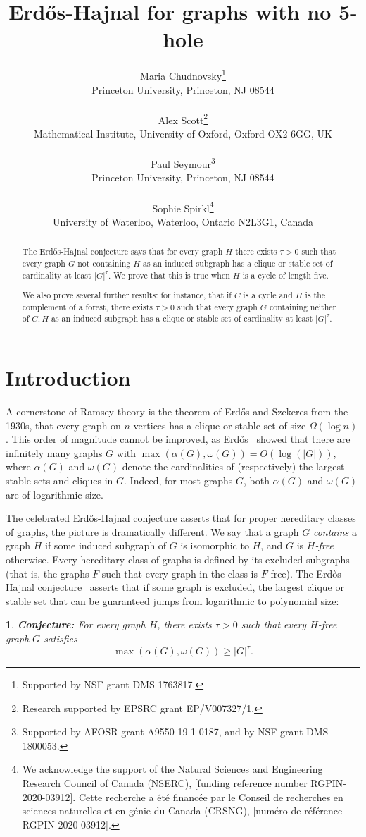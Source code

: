 \documentclass[titlepage,11pt]{article}
\title{Erd\H{o}s-Hajnal for graphs with no 5-hole}
\author{Maria Chudnovsky\thanks{Supported by  NSF grant DMS 1763817.}\\
Princeton University, Princeton, NJ 08544
\\
\\
Alex Scott\thanks{Research supported by EPSRC grant EP/V007327/1.}\\
Mathematical Institute, University of Oxford, Oxford OX2 6GG, UK
\\
\\
Paul Seymour\thanks{Supported by AFOSR grant
A9550-19-1-0187, and by NSF grant  DMS-1800053.}\\
Princeton University, Princeton, NJ 08544
\\
\\
Sophie Spirkl\thanks{We acknowledge the support of the Natural Sciences and Engineering Research
Council of Canada (NSERC), [funding reference number RGPIN-2020-03912].
Cette recherche a \'et\'e financ\'ee par le Conseil de recherches en sciences
naturelles et en g\'enie du Canada (CRSNG), [num\'ero de r\'ef\'erence
RGPIN-2020-03912].  }\\
University of Waterloo, Waterloo, Ontario N2L3G1, Canada}
\date{}
\newtheorem{thm}{}[section]
\begin{document}
\maketitle
\begin{abstract} 
The Erd\H{o}s-Hajnal conjecture says that for every graph $H$ there exists $\tau>0$
such that 
every graph $G$ not containing $H$ as an induced subgraph has a clique or stable set of cardinality at least $|G|^\tau$.
We prove that this is true when $H$ is a cycle of length five. 

We also prove several further results: for instance, that 
if $C$ is a cycle and $H$ is the complement of a forest, 
there exists $\tau>0$ such that every graph $G$ containing neither of $C,H$ as an induced subgraph
has a clique or stable set of cardinality at least $|G|^\tau$.



\end{abstract}

\section{Introduction}



A cornerstone of Ramsey theory is the theorem of Erd\H os and Szekeres \cite{ESz} from the 1930s, that every graph on $n$ vertices
has a clique or stable set of size $\Omega(\log n)$. This order of magnitude cannot be improved, as Erd\H os~\cite{E} showed 
that there are infinitely many graphs $G$ with $\max(\alpha(G),\omega(G))=O(\log(|G|))$, where $\alpha(G)$ and $\omega(G)$ denote 
the cardinalities of (respectively) the largest stable sets and 
cliques in $G$.  Indeed, for most graphs $G$, both $\alpha(G)$ and $\omega(G)$ are of logarithmic size.

The celebrated Erd\H{o}s-Hajnal conjecture asserts that for proper hereditary classes of graphs, the picture is dramatically different.  
We say that a graph $G$ {\em contains} a graph $H$ if some induced subgraph of $G$ is isomorphic to $H$, and $G$ is
{\em $H$-free} otherwise.  Every hereditary class of graphs is defined by its excluded subgraphs (that is, the graphs $F$ such that every graph in the class is $F$-free).
The Erd\H{o}s-Hajnal conjecture~\cite{EH0,EH} asserts that if some graph is excluded, the largest clique or stable set that can be guaranteed jumps from logarithmic to polynomial size:

\begin{thm}\label{EHconj}
{\bf Conjecture: }For every graph $H$, there exists $\tau>0$ such that every $H$-free graph $G$ satisfies
$$\max(\alpha(G),\omega(G))\ge |G|^\tau.$$
\end{thm}
\end{document}
